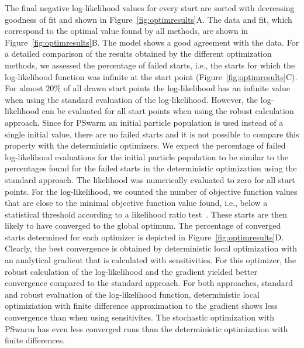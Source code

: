 \documentclass{llncs}
\begin{document}
The final negative log-likelihood values for every start are sorted with decreasing goodness of fit and shown in Figure~\ref{fig:optimresults}A. The data and fit, which correspond to the optimal value found by all methods, are shown in Figure~\ref{fig:optimresults}B. The model shows a good agreement with the data. For a detailed comparison of the results obtained by the different optimization methods, we assessed the percentage of failed starts, i.e., the starts for which the log-likelihood function was infinite at the start point (Figure~\ref{fig:optimresults}C). For almost $20\%$ of all drawn start points the log-likelihood has an infinite value when using the standard evaluation of the log-likelihood. However, the log-likelihood can be evaluated for all start points when using the robust calculation approach. Since for PSwarm an initial particle population is used instead of a single initial value, there are no failed starts and it is not possible to compare this property with the deterministic optimizers. We expect the percentage of failed log-likelihood evaluations for the initial particle population to be similar to the percentages found for the failed starts in the deterministic optimization using the standard approach. The likelihood was numerically evaluated to zero for all start points. For the log-likelihood, we counted the number of objective function values that are close to the minimal objective function value found, i.e., below a statistical threshold according to a likelihood ratio test~\cite{Hross2016}. These starts are then likely to have converged to the global optimum. The percentage of converged starts determined for each optimizer is depicted in Figure~\ref{fig:optimresults}D. Clearly, the best convergence is obtained by deterministic local optimization with an analytical gradient that is calculated with sensitivities. For this optimizer, the robust calculation of the log-likelihood and the gradient yielded better convergence compared to the standard approach. For both approaches, standard and robust evaluation of the log-likelihood function, deterministic local optimiziation with finite difference approximation to the gradient shows less convergence than when using sensitivites. The stochastic optimization with PSwarm has even less converged runs than the deterministic optimization with finite differences. 
\end{document}

